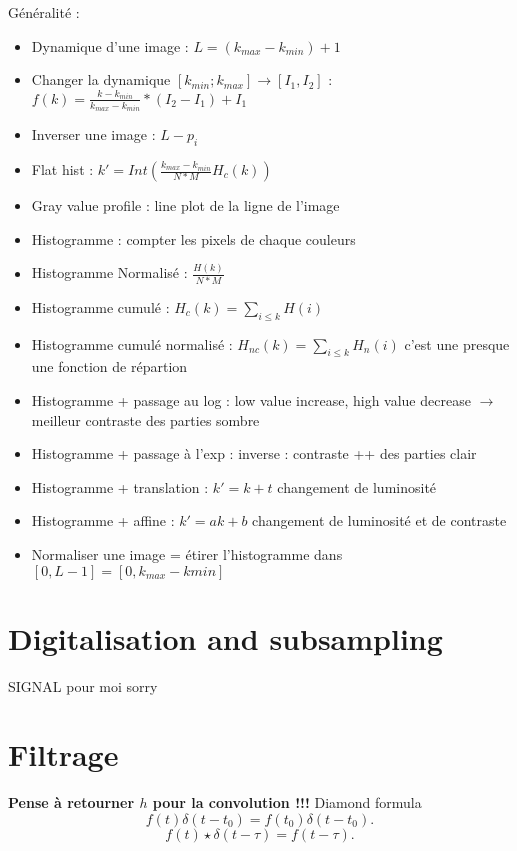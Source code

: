 \documentclass{article}
\theoremstyle{plain}%
\theoremstyle{definition}
\theoremstyle{remark}
\begin{document}
Généralité : 
\begin{itemize}
    \item Dynamique d'une image : $ L = (k_{max} - k_{min}) + 1 $ 
    \item Changer la dynamique $ [k_{min};k_{max}] \to [I_1, I_2] $  : $ f(k) = \frac{k - k_{min}}{k_{max} - k_{min}} * (I_2 - I_1) + I_1 $ 
    \item Inverser une image : $ L - p_i $ 
    \item Flat hist : $ k' = Int(\frac{k_{max} - k_{min}}{N*M}H_c(k)) $ 
    \item Gray value profile : line plot de la ligne de l'image
    \item Histogramme : compter les pixels de chaque couleurs
    \item Histogramme Normalisé : $ \frac{H(k)}{N*M} $ 
    \item Histogramme cumulé : $ H_c(k) = \sum_{i \leq k}^{}H(i) $ 
    \item Histogramme cumulé normalisé : $ H_{nc}(k) = \sum_{i \leq k}^{}H_n(i) $ c'est une presque une fonction de répartion
    \item Histogramme + passage au log : low value increase, high value decrease $\rightarrow$ meilleur contraste des parties sombre
    \item Histogramme + passage à l'exp : inverse : contraste ++ des parties clair
    \item Histogramme + translation : $ k' = k + t $ changement de luminosité 
    \item Histogramme + affine : $ k' = ak + b $ changement de luminosité et de contraste 
    \item Normaliser une image = étirer l'histogramme dans $ [0, L-1] = [0, k_{max} - k{min}] $ 
\end{itemize}

\section{Digitalisation and subsampling}
SIGNAL pour moi sorry

\section{Filtrage}
\textbf{Pense à retourner $ h $ pour la convolution !!!}
Diamond formula 
\[
    f(t)\delta (t-t_0) = f(t_0)\delta (t - t_0)
.\]
\[
    f(t) \star \delta (t - \tau) = f(t - \tau)
.\]
\end{document}
